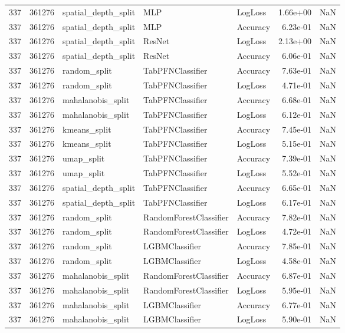 \begin{tabular}{rrlllrr}
337 & 361276 & spatial\_depth\_split & MLP & LogLoss & 1.66e+00 & NaN \\
337 & 361276 & spatial\_depth\_split & MLP & Accuracy & 6.23e-01 & NaN \\
337 & 361276 & spatial\_depth\_split & ResNet & LogLoss & 2.13e+00 & NaN \\
337 & 361276 & spatial\_depth\_split & ResNet & Accuracy & 6.06e-01 & NaN \\
337 & 361276 & random\_split & TabPFNClassifier & Accuracy & 7.63e-01 & NaN \\
337 & 361276 & random\_split & TabPFNClassifier & LogLoss & 4.71e-01 & NaN \\
337 & 361276 & mahalanobis\_split & TabPFNClassifier & Accuracy & 6.68e-01 & NaN \\
337 & 361276 & mahalanobis\_split & TabPFNClassifier & LogLoss & 6.12e-01 & NaN \\
337 & 361276 & kmeans\_split & TabPFNClassifier & Accuracy & 7.45e-01 & NaN \\
337 & 361276 & kmeans\_split & TabPFNClassifier & LogLoss & 5.15e-01 & NaN \\
337 & 361276 & umap\_split & TabPFNClassifier & Accuracy & 7.39e-01 & NaN \\
337 & 361276 & umap\_split & TabPFNClassifier & LogLoss & 5.52e-01 & NaN \\
337 & 361276 & spatial\_depth\_split & TabPFNClassifier & Accuracy & 6.65e-01 & NaN \\
337 & 361276 & spatial\_depth\_split & TabPFNClassifier & LogLoss & 6.17e-01 & NaN \\
337 & 361276 & random\_split & RandomForestClassifier & Accuracy & 7.82e-01 & NaN \\
337 & 361276 & random\_split & RandomForestClassifier & LogLoss & 4.72e-01 & NaN \\
337 & 361276 & random\_split & LGBMClassifier & Accuracy & 7.85e-01 & NaN \\
337 & 361276 & random\_split & LGBMClassifier & LogLoss & 4.58e-01 & NaN \\
337 & 361276 & mahalanobis\_split & RandomForestClassifier & Accuracy & 6.87e-01 & NaN \\
337 & 361276 & mahalanobis\_split & RandomForestClassifier & LogLoss & 5.95e-01 & NaN \\
337 & 361276 & mahalanobis\_split & LGBMClassifier & Accuracy & 6.77e-01 & NaN \\
337 & 361276 & mahalanobis\_split & LGBMClassifier & LogLoss & 5.90e-01 & NaN \\

\end{tabular}
